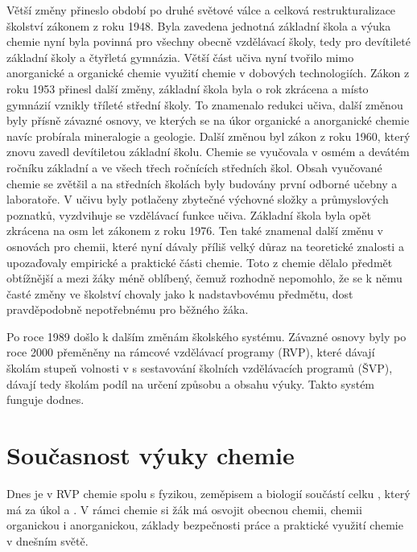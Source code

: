 Větší změny přineslo období po druhé světové válce a celková restrukturalizace školství zákonem z roku 1948. Byla zavedena jednotná základní škola a výuka chemie nyní byla povinná pro všechny obecně vzdělávací školy, tedy pro devítileté základní školy a čtyřletá gymnázia. Větší část učiva nyní tvořilo mimo anorganické a organické chemie využití chemie v dobových technologiích. Zákon z roku 1953 přinesl další změny, základní škola byla o rok zkrácena a místo gymnázií vznikly tříleté střední školy. To znamenalo redukci učiva, další změnou byly přísně závazné osnovy, ve kterých se na úkor organické a anorganické chemie navíc probírala mineralogie a geologie. Další změnou byl zákon z roku 1960, který znovu zavedl devítiletou základní školu. Chemie se vyučovala v osmém a devátém ročníku základní a ve všech třech ročnících středních škol. Obsah vyučované chemie se zvětšil a na středních školách byly budovány první odborné učebny a laboratoře. V učivu byly potlačeny zbytečné výchovné složky a průmyslových poznatků, vyzdvihuje se vzdělávací funkce učiva. Základní škola byla opět zkrácena na osm let zákonem z roku 1976. Ten také znamenal další změnu v osnovách pro chemii, které nyní dávaly příliš velký důraz na teoretické znalosti a upozaďovaly empirické a praktické části chemie. Toto z chemie dělalo předmět obtížnější a mezi žáky méně oblíbený, čemuž rozhodně nepomohlo, že se k němu časté změny ve školství chovaly jako k nadstavbovému předmětu, dost pravděpodobně nepotřebnému pro běžného žáka.\cite{historie_vyuky}\cite{u_nas_v_zahranici}

Po roce 1989 došlo k dalším změnám školského systému. Závazné osnovy byly po roce 2000 přeměněny na rámcové vzdělávací programy (RVP), které dávají školám stupeň volnosti v s sestavování školních vzdělávacích programů (ŠVP), dávají tedy školám podíl na určení způsobu a obsahu výuky. Takto systém funguje dodnes.\cite{u_nas_v_zahranici}

\section{Současnost výuky chemie}
Dnes je v RVP chemie spolu s fyzikou, zeměpisem a biologií součástí celku , který má za úkol \cite{rvp_g} a \cite{rvp_zv}. V rámci chemie si žák má osvojit obecnou chemii, chemii organickou i anorganickou, základy bezpečnosti práce a praktické využití chemie v dnešním světě.\cite{rvp_g}\cite{rvp_zv}

